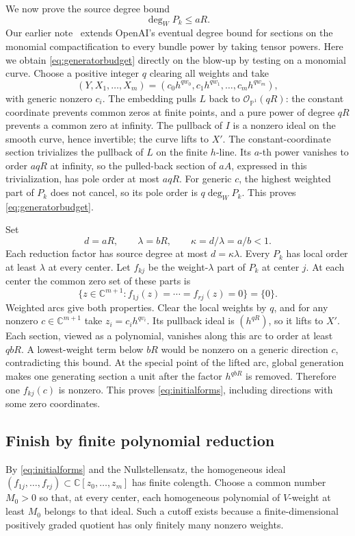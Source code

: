 \documentclass[11pt]{article}
\theoremstyle{definition}
\theoremstyle{remark}
\newcommand{\C}{\mathbb C}
\newcommand{\OO}{\mathcal O}
\numberwithin{equation}{section}
\begin{document}
We now prove the source degree bound
\begin{equation}\label{eq:generatorbudget}
 \deg_WP_k\le aR.
\end{equation}
Our earlier note~\cite{casperdegree} extends OpenAI's eventual degree
bound for sections on the monomial compactification to every bundle power
by taking tensor powers. Here we obtain \eqref{eq:generatorbudget}
directly on the blow-up by testing on a monomial curve. Choose a
positive integer \(q\) clearing all weights and take
\[
 (Y,X_1,\ldots,X_m)=(c_0h^{qw_0},c_1h^{qw_1},\ldots,c_mh^{qw_m}),
\]
with generic nonzero \(c_i\). The embedding pulls \(L\) back to
\(\OO_{\mathbb P^1}(qR)\): the constant coordinate prevents common
zeros at finite points, and a pure power of degree \(qR\) prevents
a common zero at infinity. The pullback of \(I\) is a nonzero ideal
on the smooth curve, hence invertible; the curve lifts to \(X'\).
The constant-coordinate section trivializes the pullback of \(L\) on the
finite \(h\)-line. Its \(a\)-th power vanishes to order
\(aqR\) at infinity, so the pulled-back section of \(aA\), expressed
in this trivialization, has pole order at most \(aqR\).
For generic \(c\), the highest weighted part of \(P_k\) does not
cancel, so its pole order is \(q\deg_WP_k\). This proves
\eqref{eq:generatorbudget}.

Set
\[
 d=aR,\qquad \lambda=bR,\qquad \kappa=d/\lambda=a/b<1.
\]
Each reduction factor has source degree at most \(d=\kappa\lambda\).
Every \(P_k\) has local order at least \(\lambda\) at every center.
Let \(f_{kj}\) be the weight-\(\lambda\) part of \(P_k\) at center \(j\).
At each center the common zero set of these parts is
\begin{equation}\label{eq:initialforms}
 \{z\in\C^{m+1}:f_{1j}(z)=\cdots=f_{rj}(z)=0\}=\{0\}.
\end{equation}
Weighted arcs give both properties. Clear the local
weights by \(q\), and for any nonzero \(c\in\C^{m+1}\) take
\(z_i=c_i h^{qv_i}\). Its pullback ideal is \((h^{qR})\), so it
lifts to \(X'\). Each section, viewed as a polynomial, vanishes
along this arc to order at least \(qbR\). A lowest-weight term
below \(bR\) would be nonzero on a generic direction \(c\),
contradicting this bound. At the special point of the lifted arc,
global generation makes one generating section a unit after the
factor \(h^{qbR}\) is removed. Therefore one \(f_{kj}(c)\) is
nonzero. This proves \eqref{eq:initialforms}, including directions
with some zero coordinates.

\subsection{Finish by finite polynomial reduction}
By \eqref{eq:initialforms} and the Nullstellensatz, the homogeneous ideal
\((f_{1j},\ldots,f_{rj})\subset\C[z_0,\ldots,z_m]\) has finite
colength. Choose a common number \(M_0>0\) so that, at every center,
each homogeneous polynomial of \(V\)-weight at least \(M_0\)
belongs to that ideal. Such a cutoff exists because a finite-dimensional
positively graded quotient has only finitely many nonzero weights.
\end{document}
